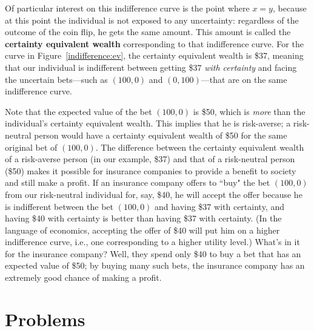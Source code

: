 \begin{CALCULUS}
Of particular interest on this indifference curve is the point where $x=y$, because at this point the individual is not exposed to any uncertainty: regardless of the outcome of the coin flip, he gets the same amount. This amount is called the \textbf{certainty equivalent wealth} corresponding to that indifference curve. For the curve in Figure~\ref{indifference:ev}, the certainty equivalent wealth is \$37, meaning that our individual is indifferent between getting \$37 \emph{with certainty} and facing the uncertain bets---such as $(100,0)$ and $(0,100)$---that are on the same indifference curve.

Note that the expected value of the bet $(100,0)$ is \$50, which is \emph{more} than the individual's certainty equivalent wealth. This implies that he is risk-averse; a risk-neutral person would have a certainty equivalent wealth of \$50 for the same original bet of $(100,0)$. The difference between the certainty equivalent wealth of a risk-averse person (in our example, \$37) and that of a risk-neutral person (\$50) makes it possible for insurance companies to provide a benefit to society and still make a profit. If an insurance company offers to ``buy" the bet $(100,0)$ from our risk-neutral individual for, say, \$40, he will accept the offer because he is indifferent between the bet $(100,0)$ and having \$37 with certainty, and having \$40 with certainty is better than having \$37 with certainty. (In the language of economics, accepting the offer of \$40 will put him on a higher indifference curve, i.e., one corresponding to a higher utility level.) What's in it for the insurance company? Well, they spend only \$40 to buy a bet that has an expected value of \$50; by buying many such bets, the insurance company has an extremely good chance of making a profit.




\end{CALCULUS}




\bigskip
\bigskip


\section*{Problems}

